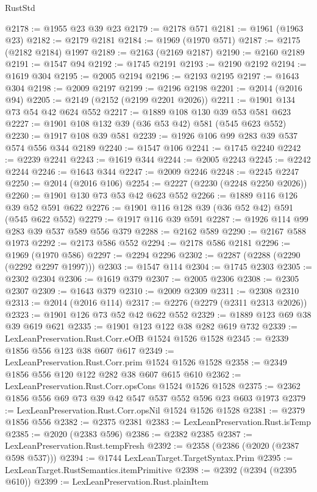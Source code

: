 \begin{lexlean}{RustStd}
\begin{coremodule}
@2178 := @1955 @23 @39 @23
@2179 := @2178 @571
@2181 := @1961 (@1963 @23)
@2182 := @2179 @2181
@2184 := @1969 (@1970 @571)
@2187 := @2175 (@2182 @2184) @1997
@2189 := @2163 (@2169 @2187)
@2190 := @2160 @2189
@2191 := @1547 @94
@2192 := @1745 @2191
@2193 := @2190 @2192
@2194 := @1619 @304
@2195 := @2005 @2194
@2196 := @2193 @2195
@2197 := @1643 @304
@2198 := @2009 @2197
@2199 := @2196 @2198
@2201 := @2014 (@2016 @94)
@2205 := @2149 (@2152 (@2199 @2201 @2026))
@2211 := @1901 @134 @73 @54 @42 @624 @552
@2217 := @1889 @108 @130 @39 @53 @581 @623
@2227 := @1901 @108 @132 @39 (@36 @53 @42) @581 (@545 @623 @552)
@2230 := @1917 @108 @39 @581
@2239 := @1926 @106 @99 @283 @39 @537 @574 @556 @344 @2189
@2240 := @1547 @106
@2241 := @1745 @2240
@2242 := @2239 @2241
@2243 := @1619 @344
@2244 := @2005 @2243
@2245 := @2242 @2244
@2246 := @1643 @344
@2247 := @2009 @2246
@2248 := @2245 @2247
@2250 := @2014 (@2016 @106)
@2254 := @2227 (@2230 (@2248 @2250 @2026))
@2260 := @1901 @130 @73 @53 @42 @623 @552
@2266 := @1889 @116 @126 @39 @52 @591 @622
@2276 := @1901 @116 @128 @39 (@36 @52 @42) @591 (@545 @622 @552)
@2279 := @1917 @116 @39 @591
@2287 := @1926 @114 @99 @283 @39 @537 @589 @556 @379
@2288 := @2162 @589
@2290 := @2167 @588 @1973
@2292 := @2173 @586 @552
@2294 := @2178 @586 @2181
@2296 := @1969 (@1970 @586)
@2297 := @2294 @2296
@2302 := @2287 (@2288 (@2290 (@2292 @2297 @1997)))
@2303 := @1547 @114
@2304 := @1745 @2303
@2305 := @2302 @2304
@2306 := @1619 @379
@2307 := @2005 @2306
@2308 := @2305 @2307
@2309 := @1643 @379
@2310 := @2009 @2309
@2311 := @2308 @2310
@2313 := @2014 (@2016 @114)
@2317 := @2276 (@2279 (@2311 @2313 @2026))
@2323 := @1901 @126 @73 @52 @42 @622 @552
@2329 := @1889 @123 @69 @38 @39 @619 @621
@2335 := @1901 @123 @122 @38 @282 @619 @732
@2339 := LexLeanPreservation.Rust.Corr.eOfB @1524 @1526 @1528
@2345 := @2339 @1856 @556 @123 @38 @607 @617
@2349 := LexLeanPreservation.Rust.Corr.prim @1524 @1526 @1528
@2358 := @2349 @1856 @556 @120 @122 @282 @38 @607 @615 @610
@2362 := LexLeanPreservation.Rust.Corr.opsCons @1524 @1526 @1528
@2375 := @2362 @1856 @556 @69 @73 @39 @42 @547 @537 @552 @596 @23 @603 @1973
@2379 := LexLeanPreservation.Rust.Corr.opsNil @1524 @1526 @1528
@2381 := @2379 @1856 @556
@2382 := @2375 @2381
@2383 := LexLeanPreservation.Rust.isTemp
@2385 := @2020 (@2383 @596)
@2386 := @2382 @2385
@2387 := LexLeanPreservation.Rust.tempFresh
@2392 := @2358 (@2386 (@2020 (@2387 @598 @537)))
@2394 := @1744 LexLeanTarget.TargetSyntax.Prim
@2395 := LexLeanTarget.RustSemantics.itemPrimitive
@2398 := @2392 (@2394 (@2395 @610))
@2399 := LexLeanPreservation.Rust.plainItem

\end{coremodule}
\end{lexlean}
